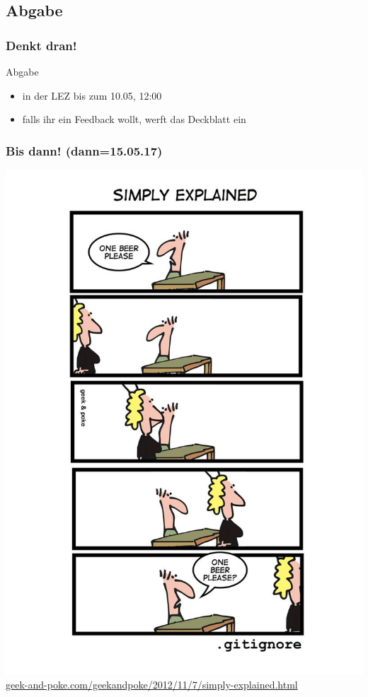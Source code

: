 \documentclass[18pt]{beamer}
\begin{document}
	\subsection{Abgabe}
	\begin{frame}
		\frametitle{Denkt dran!}
		\begin{alertblock}{Abgabe}
			\begin{itemize}
				\item in der LEZ bis zum 10.05, 12:00
				\item falls ihr ein Feedback wollt, werft das Deckblatt ein
			\end{itemize}
		\end{alertblock}
	\end{frame}
		
	\begin{frame}
		\frametitle{Bis dann! (dann=15.05.17)}
		\centering
		\includegraphics[height=0.85\textheight]{./comics/geek_and_poke_gitignore.jpg}
		\tiny\url{geek-and-poke.com/geekandpoke/2012/11/7/simply-explained.html}
	\end{frame}
\end{document}
